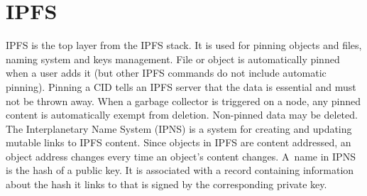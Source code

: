 \section{IPFS}
IPFS is the top layer from the IPFS stack. It is used for pinning objects and files, naming system and keys management. File or object is automatically pinned when a user adds it (but other IPFS commands do not include automatic pinning). Pinning a CID tells an IPFS server that the data is essential and must not be thrown away. When a garbage collector is triggered on a node, any pinned content is automatically exempt from deletion. Non-pinned data may be deleted. The Interplanetary Name System (IPNS) is a system for creating and updating mutable links to IPFS content. Since objects in IPFS are content addressed, an object address changes every time an object's content changes. A~name in IPNS is the hash of a public key. It is associated with a record containing information about the hash it links to that is signed by the corresponding private key.

